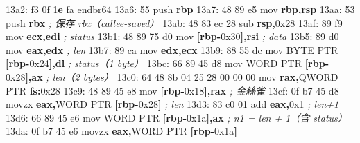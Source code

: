 \documentclass[10pt,a4paper]{article}
\newenvironment{Shaded}{\begin{snugshade}}{\end{snugshade}}
\newcommand{\BaseNTok}[1]{\textcolor[rgb]{0.00,0.00,0.81}{#1}}
\newcommand{\BuiltInTok}[1]{#1}
\newcommand{\CommentTok}[1]{\textcolor[rgb]{0.56,0.35,0.01}{\textit{#1}}}
\newcommand{\DataTypeTok}[1]{\textcolor[rgb]{0.13,0.29,0.53}{#1}}
\newcommand{\DecValTok}[1]{\textcolor[rgb]{0.00,0.00,0.81}{#1}}
\newcommand{\ErrorTok}[1]{\textcolor[rgb]{0.64,0.00,0.00}{\textbf{#1}}}
\newcommand{\FloatTok}[1]{\textcolor[rgb]{0.00,0.00,0.81}{#1}}
\newcommand{\KeywordTok}[1]{\textcolor[rgb]{0.13,0.29,0.53}{\textbf{#1}}}
\newcommand{\NormalTok}[1]{#1}
\newcommand{\OperatorTok}[1]{\textcolor[rgb]{0.81,0.36,0.00}{\textbf{#1}}}
\renewenvironment{Shaded}{%
  \def\FrameCommand{\fboxsep=3.2pt\colorbox{shadecolor}}%
  \MakeFramed{\advance\hsize-\width\FrameRestore\small}%
}{%
  \endMakeFramed
}
\begin{document}
\begin{Shaded}
\begin{Highlighting}[]
\NormalTok{13a2: f3 }\FloatTok{0}\BaseNTok{f} \DecValTok{1}\ErrorTok{e}\NormalTok{ fa            endbr64}
\NormalTok{13a6: 55                     }\BuiltInTok{push}   \KeywordTok{rbp}
\NormalTok{13a7: 48 89 e5               mov    }\KeywordTok{rbp}\OperatorTok{,}\KeywordTok{rsp}
\NormalTok{13aa: 53                     }\BuiltInTok{push}   \KeywordTok{rbx}                   \CommentTok{; 保存 rbx（callee{-}saved）}
\NormalTok{13ab: 48 83 ec }\DecValTok{28}\NormalTok{            sub    }\KeywordTok{rsp}\OperatorTok{,}\BaseNTok{0x28}
\NormalTok{13af: 89 f9                  mov    }\KeywordTok{ecx}\OperatorTok{,}\KeywordTok{edi}               \CommentTok{; status}
\NormalTok{13b1: 48 89 75 d0            mov    }\OperatorTok{[}\KeywordTok{rbp}\OperatorTok{{-}}\BaseNTok{0x30}\OperatorTok{],}\KeywordTok{rsi}        \CommentTok{; data}
\NormalTok{13b5: 89 d0                  mov    }\KeywordTok{eax}\OperatorTok{,}\KeywordTok{edx}               \CommentTok{; len}
\NormalTok{13b7: 89 ca                  mov    }\KeywordTok{edx}\OperatorTok{,}\KeywordTok{ecx}
\NormalTok{13b9: 88 55 dc               mov    }\DataTypeTok{BYTE} \DataTypeTok{PTR} \OperatorTok{[}\KeywordTok{rbp}\OperatorTok{{-}}\BaseNTok{0x24}\OperatorTok{],}\KeywordTok{dl} \CommentTok{; status（1 byte）}
\NormalTok{13bc: 66 89 45 d8            mov    }\DataTypeTok{WORD} \DataTypeTok{PTR} \OperatorTok{[}\KeywordTok{rbp}\OperatorTok{{-}}\BaseNTok{0x28}\OperatorTok{],}\KeywordTok{ax} \CommentTok{; len（2 bytes）}
\NormalTok{13c0: 64 48 8b 04 25 28 00 00 00   }\BuiltInTok{mov} \KeywordTok{rax}\OperatorTok{,}\DataTypeTok{QWORD} \DataTypeTok{PTR} \KeywordTok{fs}\OperatorTok{:}\BaseNTok{0x28}
\NormalTok{13c9: 48 89 45 e8            mov    }\OperatorTok{[}\KeywordTok{rbp}\OperatorTok{{-}}\BaseNTok{0x18}\OperatorTok{],}\KeywordTok{rax}        \CommentTok{; 金絲雀}
\NormalTok{13cf: 0f b7 }\DecValTok{45}\NormalTok{ d8            movzx  }\KeywordTok{eax}\OperatorTok{,}\DataTypeTok{WORD} \DataTypeTok{PTR} \OperatorTok{[}\KeywordTok{rbp}\OperatorTok{{-}}\BaseNTok{0x28}\OperatorTok{]} \CommentTok{; len}
\NormalTok{13d3: 83 c0 }\DecValTok{01}\NormalTok{               add    }\KeywordTok{eax}\OperatorTok{,}\BaseNTok{0x1}               \CommentTok{; len+1}
\NormalTok{13d6: 66 89 45 e6            mov    }\DataTypeTok{WORD} \DataTypeTok{PTR} \OperatorTok{[}\KeywordTok{rbp}\OperatorTok{{-}}\BaseNTok{0x1a}\OperatorTok{],}\KeywordTok{ax} \CommentTok{; n1 = len + 1（含 status）}
\NormalTok{13da: 0f b7 }\DecValTok{45}\NormalTok{ e6            movzx  }\KeywordTok{eax}\OperatorTok{,}\DataTypeTok{WORD} \DataTypeTok{PTR} \OperatorTok{[}\KeywordTok{rbp}\OperatorTok{{-}}\BaseNTok{0x1a}\OperatorTok{]}

\end{Highlighting}
\end{Shaded}
\end{document}

